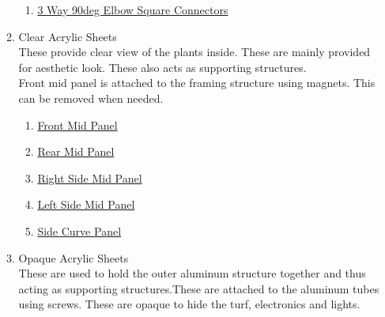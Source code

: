 \documentclass[a4paper,12pt,oneside]{book}
\begin{document}
\begin{itemize}
\begin{enumerate}
  \begin{enumerate}
  \item \href{http://a360.co/2sMp2oQ}{3 Way 90deg Elbow Square Connectors} 
  \end{enumerate}
  \item Clear Acrylic Sheets\\
  These provide clear view of the plants inside. These are mainly provided for aesthetic look. These also acts as supporting structures.\\
  Front mid panel is attached to the framing structure using magnets. This can be removed when needed.
  \begin{enumerate}
  \item \href{http://a360.co/2sq8qUr}{Front Mid Panel}
  \item \href{http://a360.co/2sGPxAG}{Rear Mid Panel}   
  \item \href{http://a360.co/2thgj1m}{Right Side Mid Panel} 
  \item \href{http://a360.co/2thgj1m}{Left Side Mid Panel}
   \item \href{http://a360.co/2tJ37U7}{Side Curve Panel}
  \end{enumerate}
  \item Opaque Acrylic Sheets\\
  These are used to hold the outer aluminum structure together and thus acting as supporting structures.These are attached to the aluminum tubes using screws. These are opaque to hide the turf, electronics and lights.
\end{enumerate}
\end{itemize}
\end{document}
